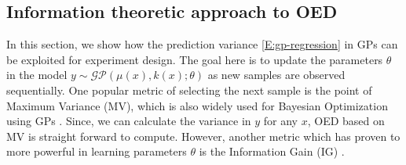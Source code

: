 \subsection{Information theoretic approach to OED}

In this section, we show how the prediction variance \eqref{E:gp-regression} in GPs can be exploited for experiment design.
The goal here is to update the parameters \(\theta\) in the model \(y \sim \mathcal{GP}(\mu(x), k(x); \theta)\) as new samples are observed sequentially. One popular metric of selecting the next sample is the point of Maximum Variance (MV), which is also widely used for Bayesian Optimization using GPs \cite{Snoek2012}. Since, we can calculate the variance in \(y\) for any \(x\), OED based on MV is straight forward to compute. However, another metric which has proven to more powerful in learning parameters \(\theta\) is the Information Gain (IG) \cite{Krause2008}. 

